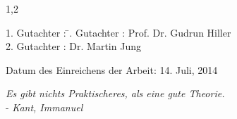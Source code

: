 \documentclass[11pt,a4paper,twoside]{report}
\begin{document}
\begin{spacing}{1,2}
\thispagestyle{empty}
\vspace*{\fill}
\begin{tabbing}
1. Gutachter : \=. Gutachter : \>Prof. Dr. Gudrun Hiller \\[11pt]
2. Gutachter : \>Dr. Martin Jung\\[11pt]
\end{tabbing}
\vspace{11pt}
Datum des Einreichens der Arbeit: 14. Juli, 2014
\newpage
\thispagestyle{empty}
\begin{flushright} 
\textit{\glqq Es gibt nichts Praktischeres, als eine gute Theorie.\grqq}\\
- \textit{Kant, Immanuel}\\
\vspace{2cm}
\end{flushright}

\newpage




\end{spacing}
\end{document}
